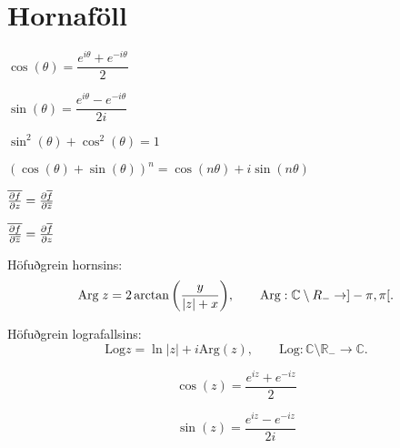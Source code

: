 \noindent
\section*{Hornaföll}

\begin{minipage}{.5\linewidth}
  $\cos(\theta) = \dfrac{e^{i \theta}+e^{-i\theta}}{2}$
\end{minipage}%
\begin{minipage}{.5\linewidth}
	$\sin(\theta) = \dfrac{e^{i \theta}-e^{-i\theta}}{2i}$
\end{minipage}

\begin{minipage}{.5\linewidth}
  $\sin^2(\theta) + \cos^2(\theta) =1$
\end{minipage}%
\begin{minipage}{.5\linewidth}
	$(\cos(\theta)+\sin(\theta))^n = \cos(n\theta)+i\sin(n\theta)$
\end{minipage}

\begin{minipage}{.5\linewidth}
	$\overline {{\frac{\partial f}{\partial z}}} = {\frac{\partial  \overline{f}}{\partial \overline z}}$
\end{minipage}%
\begin{minipage}{.5\linewidth}
	$\overline {{\frac{\partial f}{\partial \overline z}}} = {\frac{\partial \overline{f}}{\partial z}}$
\end{minipage}

\begin{minipage}{1\linewidth}
Höfuðgrein hornsins:
\begin{equation*}
  \text{Arg} \; z = 2 \arctan \bigg(\frac{y}{|z| + x} \biggl), \qquad
		  \text{Arg}: {\mathbb C} \setminus R_- \to ]-\pi,\pi[.
\end{equation*}
\end{minipage}
%
\begin{minipage}{1\linewidth}
\noindent Höfuðgrein lografallsins:
\begin{equation*}
      \text{Log} z = \ln |z| + i \text{Arg}(z), \qquad \text{Log}: \mathbb{C} \setminus \mathbb{R_{-}} \to \mathbb{C}.
\end{equation*}
\end{minipage}

\begin{equation*}
		\cos(z) = \frac{e^{iz}+e^{-iz}}2
\end{equation*}

\begin{equation*}
		\sin(z) = \frac{e^{iz}-e^{-iz}}{2i}
\end{equation*}
